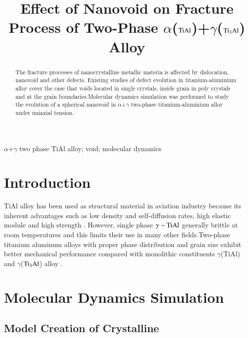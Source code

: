 \documentclass[preview,times]{elsarticle}
\begin{document}
\begin{frontmatter}
\title{Effect of Nanovoid on Fracture Process of Two-Phase $\alpha$($\rm TiAl$)+$\gamma$($\rm Ti_3Al$) Alloy}

\address[mymainaddress]{School of Mechanical and Electronical Engineering, Lanzhou University of Technology. Lanzhou 730050, China}
\begin{abstract}
 The fracture processes of nanocrystalline metallic materia is affected by dislocation, nanovoid and other defects. Existing studies of defect evolution in titanium-aluminium alloy cover the case that voids located in single crystals, inside grain in poly crystals and at the grain boundaries.Molecular dynamics simulation was performed to study the evolution of a spherical nanovoid in $\alpha$+$\gamma$ two-phase titanium-aluminium alloy under uniaxial tension.
\end{abstract}
\begin{keyword}
$\alpha$+$\gamma$ two phase TiAl alloy; void; molecular dynamics
\end{keyword}
\end{frontmatter}

\section{Introduction}
TiAl alloy has been used as structural material in aviation industry because its inherent advantages such as low density and self-diffusion rates, high elastic module and high strength \cite{Xiong2015}. However, single phase $\gamma-\rm TiAl$ generally brittle at room temperatures and this limits their use in many other fields.Two-phase titanium aluminum alloys with proper phase distribution and grain size exhibit better mechanical performance compared with monolithic constituents $\gamma$(TiAl) and $\gamma$($\rm Ti_3Al$) alloy \cite{intro-structure}.

\section{Molecular Dynamics Simulation }

\subsection{Model Creation of Crystalline}
\end{document}
